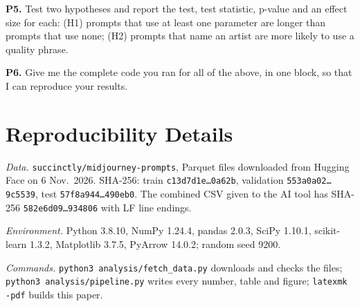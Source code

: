 \documentclass[conference]{IEEEtran}
\begin{document}
\textbf{P5.} Test two hypotheses and report the test, test statistic,
p-value and an effect size for each: (H1) prompts that use at least one
parameter are longer than prompts that use none; (H2) prompts that name
an artist are more likely to use a quality phrase.

\textbf{P6.} Give me the complete code you ran for all of the above, in
one block, so that I can reproduce your results.

\section{Reproducibility Details}
\label{app:repro}
\textit{Data.} \texttt{succinctly/midjourney-prompts}, Parquet files
downloaded from Hugging Face on 6 Nov.\ 2026. SHA-256:
train \texttt{c13d7d1e\ldots0a62b},
validation \texttt{553a0a02\ldots9c5539},
test \texttt{57f8a944\ldots490eb0}.
The combined CSV given to the AI tool has SHA-256
\texttt{582e6d09\ldots934806} with LF line endings.

\textit{Environment.} Python 3.8.10, NumPy 1.24.4, pandas 2.0.3,
SciPy 1.10.1, scikit-learn 1.3.2, Matplotlib 3.7.5, PyArrow 14.0.2;
random seed 9200.

\textit{Commands.} \texttt{python3 analysis/fetch\_data.py} downloads and
checks the files; \texttt{python3 analysis/pipeline.py} writes every
number, table and figure; \texttt{latexmk -pdf} builds this paper.
\end{document}

